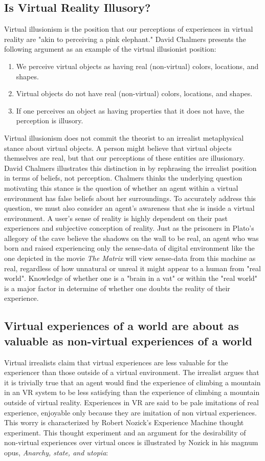 \subsection{Is Virtual Reality Illusory?}
Virtual illusionism is the position that our perceptions of experiences in virtual reality are "akin to perceiving a pink elephant." \cite{ChalmersVR} 
David Chalmers presents the following argument as an example of the virtual illusionist position: 
\begin{enumerate}
	\item We perceive virtual objects as having real (non-virtual) colors, locations, and
shapes.
\item Virtual objects do not have real (non-virtual) colors, locations, and shapes.
\item If one perceives an object as having properties that it does not have, the perception
is illusory.
\end{enumerate}
Virtual illusionism does  not commit the theorist to an irrealist metaphysical stance about virtual objects. A person might believe that virtual objects themselves are real, but that our perceptions of these entities are illusionary. David Chalmers illustrates this distinction in \cite{ChalmersVR} by rephrasing the irrealist position in terms of beliefs, not perception. Chalmers thinks the underlying question motivating this stance is the question of whether an agent within a virtual environment has false beliefs about her surroundings. To accurately address this question, we must also consider an agent's awareness that she is inside a virtual environment. 
 A user's sense of reality is highly dependent on their past experiences and subjective conception of reality. Just as the prisoners in Plato's  allegory of the cave believe the shadows on the wall to be real, an agent who was born and raised experiencing only the sense-data of digital environment like the one depicted in the movie \textit{The Matrix} will view sense-data from this machine as real, regardless of how unnatural or unreal it might appear to a human from "real world". Knowledge of whether one is a "brain in a vat" or within the "real world" is a major factor in determine of whether one doubts the reality of their experience. 
 \subsection{Virtual experiences of a  world are about as valuable as non-virtual
experiences of a world}
Virtual irrealists claim that virtual experiences are less valuable for the experiencer than those outside of a virtual environment. The irrealist argues that it is trivially true that an agent would find the experience of climbing a mountain in an VR system to be less satisfying than the experience of climbing a mountain outside of virtual reality. Experiences in VR are said to be pale imitations of real experience, enjoyable only because they are imitation of non virtual experiences. This worry is characterized by Robert Nozick's Experience Machine thought experiment. This thought experiment and an argument for the desirability of non-virtual experiences over virtual onces is illustrated by Nozick in his magnum opus, \textit{Anarchy, state, and utopia}: 

